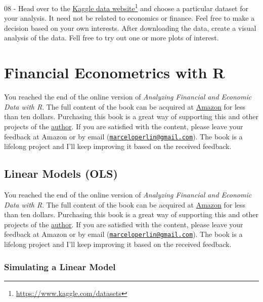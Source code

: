 \documentclass[
  12pt,
]{book}
\newenvironment{pleasebuyit}
{\begin{noteblock}
		
	} {\end{noteblock}}
\begin{document}
08 -
Head over to the \href{https://www.kaggle.com/datasets}{Kaggle data website}\footnote{\url{https://www.kaggle.com/datasets}} and choose a particular dataset for your analysis. It need not be related to economics or finance. Feel free to make a decision based on your own interests. After downloading the data, create a visual analysis of the data. Fell free to try out one or more plots of interest.

\hypertarget{models}{%
\chapter{Financial Econometrics with R}\label{models}}

\begin{pleasebuyit}
You reached the end of the online version of \emph{Analyzing Financial
and Economic Data with R}. The full content of the book can be acquired
at \href{https://www.amazon.com/dp/B084LSNXMN}{Amazon} for less than ten
dollars. Purchasing this book is a great way of supporting this and
other projects of the \href{https://www.msperlin.com/blog/}{author}. If
you are satisfied with the content, please leave your feedback at Amazon
or by email
(\href{mailto:marceloperlin@gmail.com}{\nolinkurl{marceloperlin@gmail.com}}).
The book is a lifelong project and I'll keep improving it based on the
received feedback.
\end{pleasebuyit}

\hypertarget{linear-models}{%
\section{Linear Models (OLS)}\label{linear-models}}

\begin{pleasebuyit}
You reached the end of the online version of \emph{Analyzing Financial
and Economic Data with R}. The full content of the book can be acquired
at \href{https://www.amazon.com/dp/B084LSNXMN}{Amazon} for less than ten
dollars. Purchasing this book is a great way of supporting this and
other projects of the \href{https://www.msperlin.com/blog/}{author}. If
you are satisfied with the content, please leave your feedback at Amazon
or by email
(\href{mailto:marceloperlin@gmail.com}{\nolinkurl{marceloperlin@gmail.com}}).
The book is a lifelong project and I'll keep improving it based on the
received feedback.
\end{pleasebuyit}

\hypertarget{simulating-a-linear-model}{%
\subsection{Simulating a Linear Model}\label{simulating-a-linear-model}}
\end{document}
